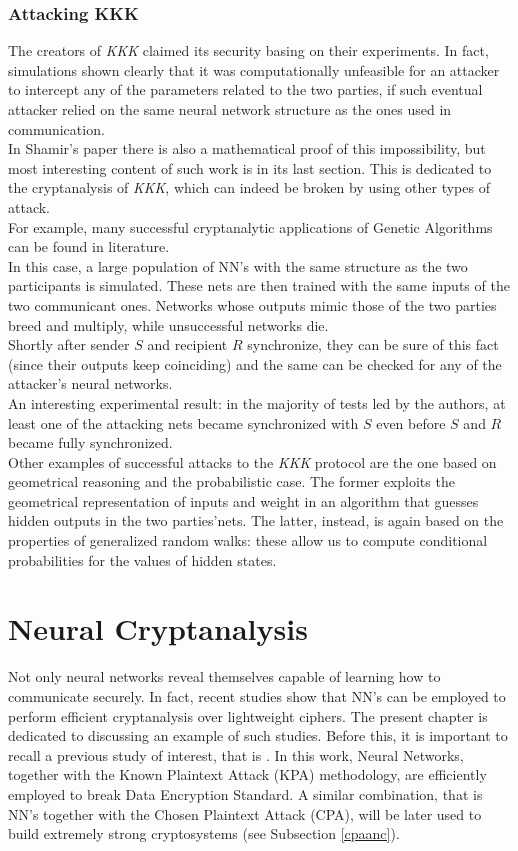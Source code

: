 \documentclass[%
    corpo=11pt,
    twoside,
    stile=classica,
    oldstyle,
    autoretitolo,
    tipotesi=magistrale,
    greek,
    evenboxes,
    english
]{toptesi}
\begin{document}
\subsection{Attacking KKK}
\label{ssc:atk}
The creators of \textit{KKK} claimed its security basing on their experiments. In fact, simulations shown clearly that it was computationally unfeasible for an attacker to intercept any of the parameters related to the two parties, if such eventual attacker relied on the same neural network structure as the ones used in communication. \\
In Shamir's paper there is also a mathematical proof of this impossibility, but most interesting content of such work is in its last section. This is dedicated to the cryptanalysis of \textit{KKK}, which can indeed be broken by using other types of attack. \\
For example, many successful cryptanalytic applications of Genetic Algorithms can be found in literature. \\
In this case, a large population of NN's with the same structure as the two participants is simulated. These nets are then trained with the same inputs of the two communicant ones. Networks whose outputs mimic those of the two parties breed and multiply, while unsuccessful networks die. \\
Shortly after sender $S$ and recipient $R$ synchronize, they can be sure of this fact (since their outputs keep coinciding) and the same can be checked for any of the attacker's neural networks. \\
An interesting experimental result: in the majority of tests led by the authors, at least one  of the attacking nets became synchronized with $S$ even before $S$ and $R$ became fully synchronized. \\
Other examples of successful attacks to the \textit{KKK} protocol are the one based on geometrical reasoning and the probabilistic case. The former exploits the geometrical representation of inputs and weight in an algorithm that guesses hidden outputs in the two parties'nets. The latter, instead, is again based on the properties of generalized random walks: these allow us to compute conditional probabilities for the values of hidden states.

\chapter{Neural Cryptanalysis}
Not only neural networks reveal themselves capable of learning how to communicate securely. In fact, recent studies show that NN's can be employed to perform efficient cryptanalysis over lightweight ciphers. The present chapter is dedicated to discussing an example of such studies. Before this, it is important to recall a previous study of interest, that is \cite{alani}. In this work, Neural Networks, together with the Known Plaintext Attack (KPA) methodology, are efficiently employed to break Data Encryption Standard. A similar combination, that is NN's together with the Chosen Plaintext Attack (CPA), will be later used to build extremely strong cryptosystems (see Subsection \ref{cpaanc}). \\
\end{document}
